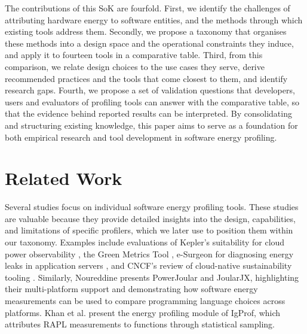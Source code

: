 \documentclass[
  acmsmall,
  screen,
  review,
  xcolor={dvipsnames,usenames}
]{acmart}
\begin{document}
The contributions of this SoK are fourfold. First, we identify the challenges of attributing hardware energy to software entities, and the methods through which existing tools address them. Secondly, we propose a taxonomy that organises these methods into a design space and the operational constraints they induce, and apply it to fourteen tools in a comparative table. Third, from this comparison, we relate design choices to the use cases they serve, derive recommended practices and the tools that come closest to them, and identify research gaps. Fourth, we propose a set of validation questions that developers, users and evaluators of profiling tools can answer with the comparative table, so that the evidence behind reported results can be interpreted. By consolidating and structuring existing knowledge, this paper aims to serve as a foundation for both empirical research and tool development in software energy profiling.

\section{Related Work}\label{sec:related-work}

Several studies focus on individual software energy profiling tools. These studies are valuable because they provide detailed insights into the design, capabilities, and limitations of specific profilers, which we later use to position them within our taxonomy. Examples include evaluations of Kepler's suitability for cloud power observability \cite{bellalInvestigatingPotentialKepler}, the Green Metrics Tool \cite{hoffmannGreenMetricsTool2025}, e-Surgeon for diagnosing energy leaks in application servers \cite{noureddineESurgeonDiagnosingEnergy2012}, and CNCF's review of cloud-native sustainability tooling \cite{cncfExploringKeplersPotentials2023}. Similarly, Noureddine \cite{noureddinePowerJoularJoularJXMultiPlatform2022} presents PowerJoular and JoularJX, highlighting their multi-platform support and demonstrating how software energy measurements can be used to compare programming language choices across platforms. Khan et al. \cite{khanEnergyProfilingUsing2015} present the energy profiling module of IgProf, which attributes RAPL measurements to functions through statistical sampling.
\end{document}
